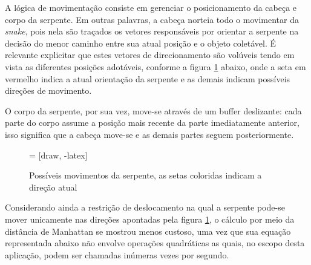 \documentclass[conference]{IEEEtran}
\begin{document}
A lógica de movimentação consiste em gerenciar o posicionamento da cabeça e corpo da serpente.  Em outras palavras, a cabeça norteia todo o movimentar da \textit{snake}, pois nela são traçados os vetores responsáveis por orientar a serpente na decisão do menor caminho entre sua atual posição e o objeto coletável. É relevante explicitar que estes vetores de direcionamento são volúveis tendo em vista as diferentes posições adotáveis, conforme a figura \ref{fig:snakeHeadPositions} abaixo, onde a seta em vermelho indica a atual orientação da serpente e as demais indicam possíveis direções de movimento.

O corpo da serpente, por sua vez, move-se através de um buffer deslizante: cada parte do corpo assume a posição mais recente da parte imediatamente anterior, isso significa que a cabeça move-se e as demais partes seguem posteriormente.

\begin{figure}[H]
\centering
{} = [draw, -latex]

\caption{Possíveis movimentos da serpente, as setas coloridas indicam a direção atual}
\label{fig:snakeHeadPositions}
\end{figure}

Considerando ainda a restrição de deslocamento na qual a serpente pode-se mover unicamente nas direções apontadas pela figura \ref{fig:snakeHeadPositions}, o cálculo por meio da distância de Manhattan se mostrou menos custoso, uma vez que sua equação representada abaixo não envolve operações quadráticas as quais, no escopo desta aplicação, podem ser chamadas inúmeras vezes por segundo.
\end{document}
